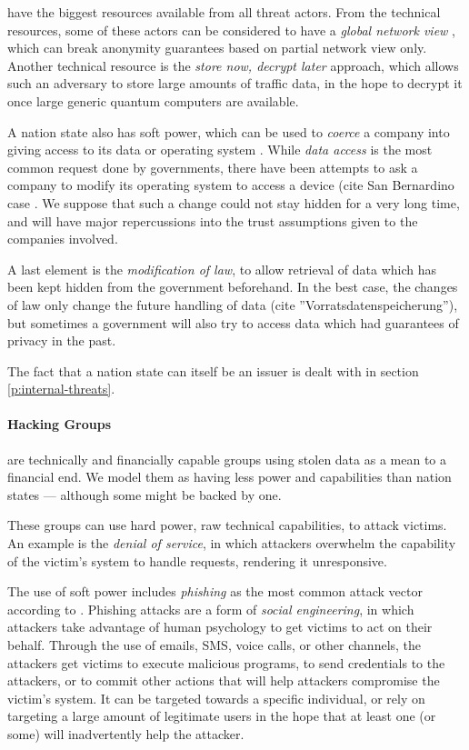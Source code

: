 have the biggest resources available from all threat actors.
From the technical resources, some of these actors can be considered to have a \emph{global network view}
\cite{TorAttack}, which can break anonymity guarantees based on partial network view only.
Another technical resource is the \emph{store now, decrypt later} approach, which allows such an adversary
to store large amounts of traffic data, in the hope to decrypt it once large generic quantum computers
are available.

A nation state also has soft power, which can be used to \emph{coerce} a company into giving
access to its data or operating system \cite{TelegramArrest}\cite{ProtonLogging}.
While \emph{data access} is the most common request done by governments, there have been attempts
to ask a company to modify its operating system to access a device (cite San Bernardino case
\cite{AppleSanBernardino}.
We suppose that such a change could not stay hidden for a very long time, and will have major
repercussions into the trust assumptions given to the companies involved.

A last element is the \emph{modification of law}, to allow retrieval of data which has been
kept hidden from the government beforehand.
In the best case, the changes of law only change the future handling of data (cite
''Vorratsdatenspeicherung''), but sometimes a government will also try to access
data which had guarantees of privacy in the past.

The fact that a nation state can itself be an issuer is dealt with in section \ref{p:internal-threats}.

\paragraph{Hacking Groups} are technically and financially capable groups using stolen data as a mean to a financial end.
We model them as having less power and capabilities than nation states --- although some might be backed by one.

These groups can use hard power, raw technical capabilities, to attack victims. 
An example is the \emph{denial of service}, in which attackers
overwhelm the capability of the victim's system to handle requests, rendering it unresponsive.

The use of soft power includes \emph{phishing} as the most common attack vector according to \cite{IC3-24}.
Phishing attacks are a form of \emph{social engineering}, in which attackers take advantage of human psychology to get victims to act on their behalf.
Through the use of emails, SMS, voice calls, or other channels, the attackers get victims to execute malicious programs, to send credentials to the attackers, or to commit other actions that will help attackers compromise the victim's system.
It can be targeted towards a specific individual, or rely on targeting a large amount of legitimate users in the hope that at least one (or some) will inadvertently help the attacker.

